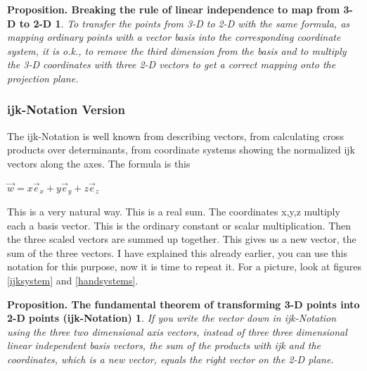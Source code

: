 \documentclass[a4paper]{article}
\begin{document}
\newtheorem{VectorBasisBrokenLaw}{Proposition. Breaking the rule of linear independence to map from 3-D to 2-D}
\begin{VectorBasisBrokenLaw}
\label{broken_law_basis}
To transfer the points from 3-D to 2-D with the same formula, as mapping ordinary points with a vector basis into 
the corresponding coordinate system, it is o.k., to remove the third dimension from the basis and to multiply the
3-D coordinates with three 2-D vectors to get a correct mapping onto the projection plane.
\end{VectorBasisBrokenLaw}

\subsubsection{ijk-Notation Version}

The ijk-Notation is well known from describing vectors, from calculating cross products over determinants, from coordinate systems showing the normalized ijk vectors along the axes. The formula is this\\

\begin{center}
 $\vec{w} = x\vec{e}_{x}+y\vec{e}_{y}+z\vec{e}_{z}$
\end{center}

This is a very natural way. This is a real sum. The coordinates x,y,z multiply each a basis vector. This is the ordinary constant or scalar multiplication. Then the three scaled vectors are summed up together. This gives us a new vector, the sum of the three vectors. I have explained this already earlier, you can use this notation for this purpose, now it is time to repeat it. For a picture, look at figures \ref{ijksystem} and \ref{handsystems}.\\

\newtheorem{ijkVersion}{Proposition. The fundamental theorem of transforming 3-D points into 2-D points (ijk-Notation)}
\begin{ijkVersion}
If you write the vector down in ijk-Notation using the three two dimensional axis vectors, instead of three three dimensional linear independent basis vectors, the sum of the products with ijk and the coordinates, which is a new vector, equals the right vector on the 2-D plane.
\end{ijkVersion}
\end{document}
